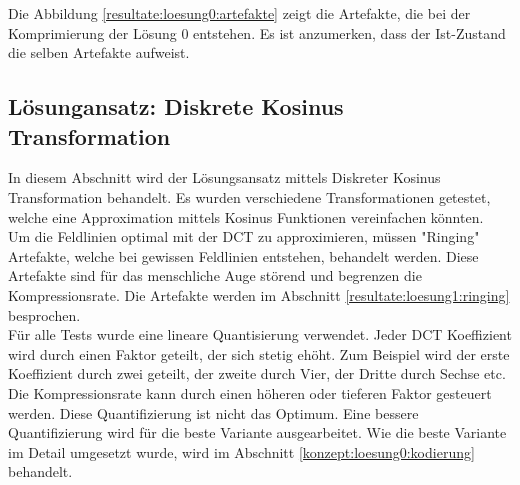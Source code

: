 Die Abbildung \ref{resultate:loesung0:artefakte} zeigt die Artefakte, die bei der Komprimierung der Lösung 0 entstehen. Es ist anzumerken, dass der Ist-Zustand die selben Artefakte aufweist.
\pagebreak

\subsection{Lösungansatz: Diskrete Kosinus Transformation}
In diesem Abschnitt wird der Lösungsansatz mittels Diskreter Kosinus Transformation behandelt. Es wurden verschiedene Transformationen getestet, welche eine Approximation mittels Kosinus Funktionen vereinfachen könnten.\\
Um die Feldlinien optimal mit der DCT zu approximieren, müssen "Ringing" Artefakte, welche bei gewissen Feldlinien entstehen, behandelt werden. Diese Artefakte sind für das menschliche Auge störend und begrenzen die Kompressionsrate. Die Artefakte werden im Abschnitt \ref{resultate:loesung1:ringing} besprochen.\\
[\baselineskip]
Für alle Tests wurde eine lineare Quantisierung verwendet. Jeder DCT Koeffizient wird durch einen Faktor geteilt, der sich stetig ehöht. Zum Beispiel wird der erste Koeffizient durch zwei geteilt, der zweite durch Vier, der Dritte durch Sechse etc.  Die Kompressionsrate kann durch einen höheren oder tieferen Faktor gesteuert werden. Diese Quantifizierung ist nicht das Optimum. Eine bessere Quantifizierung wird für die beste Variante ausgearbeitet. Wie die beste Variante im Detail umgesetzt wurde, wird im Abschnitt \ref{konzept:loesung0:kodierung} behandelt. 

